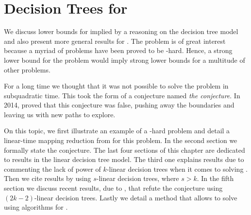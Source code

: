 \chapter{Decision Trees for \threeSUM}
\label{tree:3sum}

We discuss lower bounds for \threeSUM implied by a
reasoning on the decision tree model and also present more
general results for \kLDT. The \threeSUM problem is of great
interest because a myriad of problems
have been proved to be \threeSUM-hard. Hence, a strong lower bound for
the \threeSUM problem would imply strong lower bounds for a multitude of other
problems.

For a long time we thought that it was not possible to solve the \threeSUM
problem in subquadratic time. This took the form of a
conjecture named \emph{the \threeSUM conjecture}. In 2014, \citet*{gronlund:2014}
proved that this conjecture was false, pushing away the
boundaries and leaving us with new paths to explore.

On this topic, we first illustrate an example of a \threeSUM-hard problem
and detail a linear-time mapping reduction from \threeSUM for this problem. In
the second section we formally state the \threeSUM conjecture. The last
four sections of this chapter are dedicated to results in the linear
decision tree model. The third one explains results due to
\citet*{erickson:1999} commenting the lack of power of $k$-linear decision
trees when it comes to solving \ksum. Then we cite results by
\citet*{ailon:2005} using $s$-linear decision trees, where \(s > k\). In the fifth section
we discuss recent results, due to \citet*{gronlund:2014}, that refute
the \threeSUM conjecture using $(2k-2)$-linear decision trees. Lastly we
detail a method that allows to solve \kLDT using algorithms for \threeSUM.
